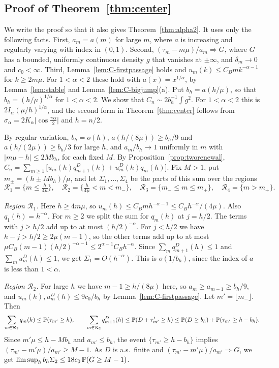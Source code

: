\subsection{Proof of Theorem~\texorpdfstring{\ref{thm:center}}{4.4}}

We write the proof so that it also gives Theorem~\ref{thm:alpha2}. It uses
only the following facts. First, $a_m=a(m)$ for large $m$, where $a$ is
increasing and regularly varying with index in $(0,1)$. Second,
$(\tau_m-m\mu)/a_m\Rightarrow G$, where $G$ has a bounded, uniformly
continuous density $g$ that vanishes at $\pm\infty$, and $\delta_m\to0$ and
$c_0<\infty$. Third, Lemma~\ref{lem:C-firstpassage} holds and
$u_m(k)\le C_Bmk^{-\alpha-1}$ for $k\ge2m\mu$. For $1<\alpha<2$ these hold with
$a(x)=x^{1/\alpha}$, by Lemma~\ref{lem:stable} and
Lemma~\ref{lem:C-bigjump}(a). Put $b_h=a(h/\mu)$, so that
$b_h=(h/\mu)^{1/\alpha}$ for $1<\alpha<2$. We show that
$C_n\sim2b_h^{-1}\int g^2$. For $1<\alpha<2$ this is
$2I_\alpha(\mu/h)^{1/\alpha}$, and the second form in
Theorem~\ref{thm:center} follows from
$\sigma_\alpha=2K_\alpha\lvert\cos\frac{\pi\alpha}2\rvert$ and $h=n/2$.

By regular variation, $b_h=o(h)$, $a(h/(8\mu))\ge b_h/9$ and
$a(h/(2\mu))\ge b_h/3$ for large $h$, and $a_m/b_h\to1$ uniformly in $m$
with $\lvert m\mu-h\rvert\le2Mb_h$, for each fixed $M$. By
Proposition~\ref{prop:tworenewal},
$C_n=\sum_{m\ge1}\bigl[u_m(h)q^D_{m+1}(h)+u^D_m(h)q_m(h)\bigr]$. Fix $M>1$, put
$m_\pm=(h\pm Mb_h)/\mu$, and let $\Sigma_1,\dots,\Sigma_4$ be the parts of
this sum over the regions
\[
\mathcal R_1=\{m\le\tfrac h{4\mu}\},\quad
\mathcal R_2=\{\tfrac h{4\mu}<m<m_-\},\quad
\mathcal R_3=\{m_-\le m\le m_+\},\quad
\mathcal R_4=\{m>m_+\}.
\]

\emph{Region $\mathcal R_1$.} Here $h\ge4m\mu$, so
$u_m(h)\le C_Bmh^{-\alpha-1}\le C_Bh^{-\alpha}/(4\mu)$. Also
$q_1(h)=h^{-\alpha}$. For $m\ge2$ we split the sum for $q_m(h)$ at $j=h/2$.
The terms with $j\ge h/2$ add up to at most $(h/2)^{-\alpha}$. For $j<h/2$ we
have $h-j>h/2\ge2\mu(m-1)$, so the other terms add up to at most
$\mu C_B(m-1)(h/2)^{-\alpha-1}\le2^{\alpha-1}C_Bh^{-\alpha}$. Since
$\sum_mq^D_{m+1}(h)\le1$ and $\sum_mu^D_m(h)\le1$, we get
$\Sigma_1=O(h^{-\alpha})$. This is $o(1/b_h)$, since the index of $a$ is
less than $1<\alpha$.

\emph{Region $\mathcal R_2$.} For large $h$ we have $m-1\ge h/(8\mu)$ here, so
$a_m\ge a_{m-1}\ge b_h/9$, and $u_m(h),u^D_m(h)\le9c_0/b_h$ by
Lemma~\ref{lem:C-firstpassage}. Let $m'=\lfloor m_-\rfloor$. Then
\[
\sum_{m\in\mathcal R_2}q_m(h)\le\mathbb{P}(\tau_{m'}\ge h),\qquad
\sum_{m\in\mathcal R_2}q^D_{m+1}(h)\le\mathbb{P}(D+\tau'_{m'}\ge h)
\le\mathbb{P}(D\ge b_h)+\mathbb{P}(\tau_{m'}\ge h-b_h).
\]
Since $m'\mu\le h-Mb_h$ and $a_{m'}\le b_h$, the event
$\{\tau_{m'}\ge h-b_h\}$ implies $(\tau_{m'}-m'\mu)/a_{m'}\ge M-1$. As $D$ is
a.s.\ finite and $(\tau_{m'}-m'\mu)/a_{m'}\Rightarrow G$, we get
$\limsup_hb_h\Sigma_2\le18c_0\,\mathbb{P}(G\ge M-1)$.

